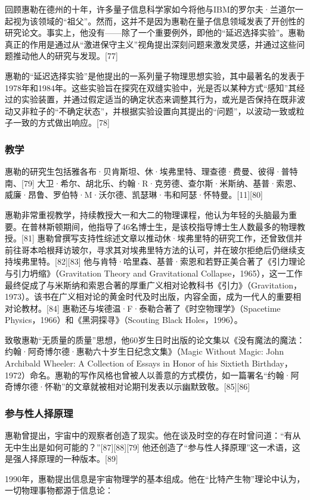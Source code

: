 回顾惠勒在德州的十年，许多量子信息科学家如今将他与IBM的罗尔夫·兰道尔一起视为该领域的“祖父”。然而，这并不是因为惠勒在量子信息领域发表了开创性的研究论文。事实上，他没有——除了一个重要例外，即他的“延迟选择实验”。惠勒真正的作用是通过从“激进保守主义”视角提出深刻问题来激发灵感，并通过这些问题推动他人的研究与发现。[77]

惠勒的“延迟选择实验”是他提出的一系列量子物理思想实验，其中最著名的发表于1978年和1984年。这些实验旨在探究在双缝实验中，光是否以某种方式“感知”其经过的实验装置，并通过假定适当的确定状态来调整其行为，或光是否保持在既非波动又非粒子的“不确定状态”，并根据实验设置向其提出的“问题”，以波动一致或粒子一致的方式做出响应。[78]
\subsubsection{教学}
惠勒的研究生包括雅各布·贝肯斯坦、休·埃弗里特、理查德·费曼、彼得·普特南、[79] 大卫·希尔、胡北乐、约翰·R·克劳德、查尔斯·米斯纳、基普·索恩、威廉·昂鲁、罗伯特·M·沃尔德、凯瑟琳·韦和阿瑟·怀特曼。[11][80]

惠勒非常重视教学，持续教授大一和大二的物理课程，他认为年轻的头脑最为重要。在普林斯顿期间，他指导了46名博士生，是该校指导博士生人数最多的物理教授。[81] 惠勒曾撰写支持性综述文章以推动休·埃弗里特的研究工作，还曾致信并前往哥本哈根拜访玻尔，寻求其对埃弗里特方法的认可，并在玻尔拒绝后仍继续支持埃弗里特。[82][83] 他与肯特·哈里森、基普·索恩和若野正美合著了《引力理论与引力坍缩》（Gravitation Theory and Gravitational Collapse，1965），这一工作最终促成了与米斯纳和索恩合著的厚重广义相对论教科书《引力》（Gravitation，1973）。该书在广义相对论的黄金时代及时出版，内容全面，成为一代人的重要相对论教材。[84] 惠勒还与埃德温·F·泰勒合著了《时空物理学》（Spacetime Physics，1966）和《黑洞探寻》（Scouting Black Holes，1996）。

致敬惠勒“无质量的质量”思想，他60岁生日时出版的论文集以《没有魔法的魔法：约翰·阿奇博尔德·惠勒六十岁生日纪念文集》（Magic Without Magic: John Archibald Wheeler: A Collection of Essays in Honor of his Sixtieth Birthday，1972）命名。惠勒的写作风格也曾被人以善意的方式模仿，如一篇署名“约翰·阿奇博尔德·怀勒”的文章就被相对论期刊发表以示幽默致敬。[85][86]
\subsubsection{参与性人择原理}
惠勒曾提出，宇宙中的观察者创造了现实。他在谈及时空的存在时曾问道：“有从无中生出是如何可能的？”[87][88][79] 他还创造了“参与性人择原理”这一术语，这是强人择原理的一种版本。[89]

1990年，惠勒提出信息是宇宙物理学的基本组成。他在“比特产生物”理论中认为，一切物理事物都源于信息论：

